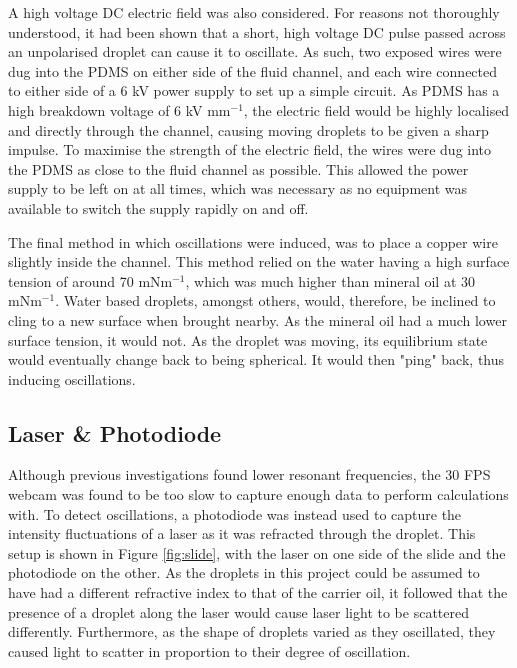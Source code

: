 \documentclass{physics_article_B}
\begin{document}
        A high voltage DC electric field was also considered. For reasons not thoroughly understood, it had been shown that a short, high voltage DC pulse passed across an unpolarised droplet can cause it to oscillate\cite{DCfield}. As such, two exposed wires were dug into the PDMS on either side of the fluid channel, and each wire connected to either side of a 6 kV power supply to set up a simple circuit. As PDMS has a high breakdown voltage of\cite{PDMSBreakdown} 6 kV mm$^{-1}$, the electric field would be highly localised and directly through the channel, causing moving droplets to be given a sharp impulse. To maximise the strength of the electric field, the wires were dug into the PDMS as close to the fluid channel as possible. This allowed the power supply to be left on at all times, which was necessary as no equipment was available to switch the supply rapidly on and off. 
        
        The final method in which oscillations were induced, was to place a copper wire slightly inside the channel. This method relied on the water having a high surface tension of around 70 mNm$^{-1}$, which was much higher than mineral oil at 30 mNm$^{-1}$. Water based droplets, amongst others, would, therefore, be inclined to cling to a new surface when brought nearby. As the mineral oil had a much lower surface tension, it would not. As the droplet was moving, its equilibrium state would eventually change back to being spherical. It would then "ping" back, thus inducing oscillations. 
        
    \subsection{Laser \& Photodiode\label{sect:method:laser}}
    
        Although previous investigations found lower resonant frequencies\cite{Temperton2012}, the 30 FPS webcam was found to be too slow to capture enough data to perform calculations with. To detect oscillations, a photodiode was instead used to capture the intensity fluctuations of a laser as it was refracted through the droplet. This setup is shown in Figure \ref{fig:slide}, with the laser on one side of the slide and the photodiode on the other. As the droplets in this project could be assumed to have had a different refractive index to that of the carrier oil\cite{viscosity1,viscosity2}, it followed that the presence of a droplet along the laser would cause laser light to be scattered differently. Furthermore, as the shape of droplets varied as they oscillated, they caused light to scatter in proportion to their degree of oscillation. 
        
\end{document}
